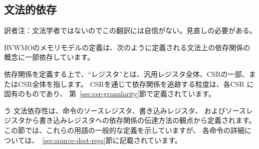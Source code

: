 \subsection*{文法的依存}
\begin{commentary}
訳者注：文法学者ではないのでこの翻訳には自信がない。見直しの必要がある。
\end{commentary}
\label{sec:memorymodel:dependencies}

\begin{comment}
The definition of the RVWMO memory model depends in part on the notion of a syntactic dependency, defined as follows.
\end{comment}

RVWMOのメモリモデルの定義は、次のように定義される文法上の依存関係の概念に一部依存しています。

\begin{comment}
In the context of defining dependencies, a ``register'' refers either to an entire general-purpose register, some portion of a CSR, or an entire CSR.  The granularity at which dependencies are tracked through CSRs is specific to each CSR and is defined in Section~\ref{sec:csr-granularity}.
\end{comment}

依存関係を定義する上で、``レジスタ''とは、汎用レジスタ全体、CSRの一部、またはCSR全体を指します。 
CSRを通じて依存関係を追跡する粒度は、各CSR に固有のものであり、
第~\ref{sec:csr-granularity}節で定義されています。

\begin{comment}
Syntactic dependencies are defined in terms of instructions' {\em source registers}, instructions' {\em destination registers}, and the way instructions {\em carry a dependency} from their source registers to their destination registers.
This section provides a general definition of all of these terms; however, Section~\ref{sec:source-dest-regs} provides a complete listing of the specifics for each instruction.
\end{comment}	う
文法依存性は、命令のソースレジスタ、書き込みレジスタ、
およびソースレジスタから書き込みレジスタへの依存関係の伝達方法の観点から定義されます。
この節では、これらの用語の一般的な定義を示していますが、
各命令の詳細については、~\ref{sec:source-dest-regs}節に記載されています。

